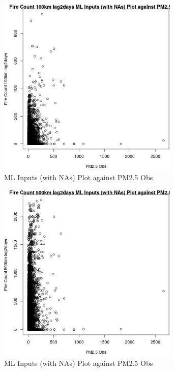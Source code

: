 \begin{figure} 
\centering  
\includegraphics[width=0.77\textwidth]{Code_Outputs/Report_ML_input_PM25_Step4_part_e_de_duplicated_aves_compiled_2019-05-20wNAs_Fire_Count_100km_lag2daysvPM25_Obs.jpg} 
\caption{\label{fig:Report_ML_input_PM25_Step4_part_e_de_duplicated_aves_compiled_2019-05-20wNAsFire_Count_100km_lag2daysvPM25_Obs}ML Inputs (with NAs) Plot against PM2.5 Obs} 
\end{figure} 
 

\begin{figure} 
\centering  
\includegraphics[width=0.77\textwidth]{Code_Outputs/Report_ML_input_PM25_Step4_part_e_de_duplicated_aves_compiled_2019-05-20wNAs_Fire_Count_500km_lag2daysvPM25_Obs.jpg} 
\caption{\label{fig:Report_ML_input_PM25_Step4_part_e_de_duplicated_aves_compiled_2019-05-20wNAsFire_Count_500km_lag2daysvPM25_Obs}ML Inputs (with NAs) Plot against PM2.5 Obs} 
\end{figure} 
 

